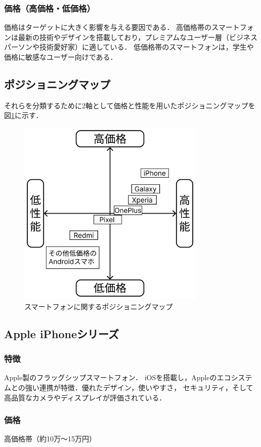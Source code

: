 \documentclass[titlepage,a4paper]{jsarticle}
\begin{document}
\subsubsection{価格（高価格・低価格）}
価格はターゲットに大きく影響を与える要因である．
高価格帯のスマートフォンは最新の技術やデザインを搭載しており，プレミアムなユーザー層（ビジネスパーソンや技術愛好家）に適している．
低価格帯のスマートフォンは，学生や価格に敏感なユーザー向けである．
\subsection{ポジショニングマップ}
それらを分類するために2軸として価格と性能を用いたポジショニングマップを図\ref{smart}に示す．
\begin{figure}[H]
\centering
\includegraphics[width=0.8\textwidth]{img/pMap3.png}
\caption{スマートフォンに関するポジショニングマップ}
\label{smart}
\end{figure}

\subsection{Apple iPhoneシリーズ}
\subsubsection{特徴}
Apple製のフラッグシップスマートフォン．
iOSを搭載し，Appleのエコシステムとの強い連携が特徴．優れたデザイン，使いやすさ，
セキュリティ，そして高品質なカメラやディスプレイが評価されている．
\subsubsection{価格}
高価格帯（約10万～15万円）
\end{document}
